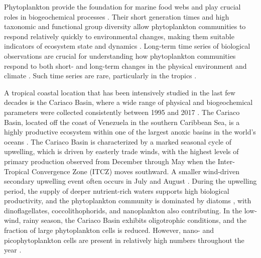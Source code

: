 \documentclass[draft]{agujournal2019}
\begin{document}

Phytoplankton provide the foundation for marine food webs and play crucial roles in biogeochemical processes \cite{falkowski_biogeochemical_1998}. Their short generation times and high taxonomic and functional group diversity allow phytoplankton communities to respond relatively quickly to environmental changes, making them suitable indicators of ecosystem state and dynamics \cite{alvarez-cobelas_what_1998, barton_anthropogenic_2016, di_cavalho_temporal_2023}. Long-term time series of biological observations are crucial for understanding how phytoplankton communities respond to both short- and long-term changes in the physical environment and climate \cite{carstensen_need_2014, henson_observing_2016}. Such time series are rare, particularly in the tropics \cite{clarke_does_2017}. 

A tropical coastal location that has been intensively studied in the last few decades is the Cariaco Basin, where a wide range of physical and biogeochemical parameters were collected consistently between 1995 and 2017 \cite{muller-karger_scientific_2019}. The Cariaco Basin, located off the coast of Venezuela in the southern Caribbean Sea, is a highly productive ecosystem within one of the largest anoxic basins in the world's oceans \cite{edgcomb_accessing_2011}. The Cariaco Basin is characterized by a marked seasonal cycle of upwelling, which is driven by easterly trade winds, with the highest levels of primary production observed from December through May when the Inter-Tropical Convergence Zone (ITCZ) moves southward. A smaller wind-driven secondary upwelling event often occurs in July and August \cite{mullerkarger_annual_2001, astor_seasonal_2003}. During the upwelling period, the supply of deeper nutrient-rich waters supports high biological productivity, and the phytoplankton community is dominated by diatoms \cite{romero_seasonal_2009}, with dinoflagellates, coccolithophorids, and nanoplankton also contributing. In the low-wind, rainy season, the Cariaco Basin exhibits oligotrophic conditions, and the fraction of large phytoplankton cells is reduced. However, nano- and picophytoplankton cells are present in relatively high numbers throughout the year \cite{lorenzoni_characterization_2015}.    
\end{document}
